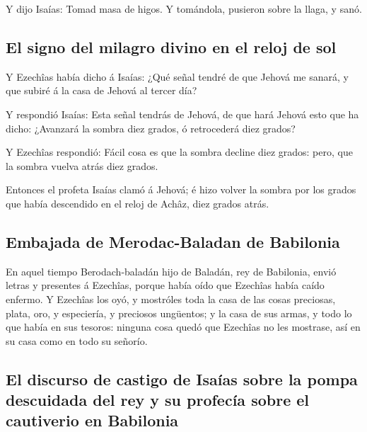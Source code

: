  Y dijo Isaías: Tomad masa de higos. Y tomándola, pusieron
sobre la llaga, y sanó.

\hypertarget{el-signo-del-milagro-divino-en-el-reloj-de-sol}{%
\subsection{El signo del milagro divino en el reloj de
sol}\label{el-signo-del-milagro-divino-en-el-reloj-de-sol}}

 Y Ezechîas había dicho á Isaías: ¿Qué señal tendré de que
Jehová me sanará, y que subiré á la casa de Jehová al tercer día?

 Y respondió Isaías: Esta señal tendrás de Jehová, de que
hará Jehová esto que ha dicho: ¿Avanzará la sombra diez grados, ó
retrocederá diez grados?

 Y Ezechîas respondió: Fácil cosa es que la sombra decline
diez grados: pero, que la sombra vuelva atrás diez grados.

 Entonces el profeta Isaías clamó á Jehová; é hizo volver
la sombra por los grados que había descendido en el reloj de Achâz, diez
grados atrás.

\hypertarget{embajada-de-merodac-baladan-de-babilonia}{%
\subsection{Embajada de Merodac-Baladan de
Babilonia}\label{embajada-de-merodac-baladan-de-babilonia}}

 En aquel tiempo Berodach-baladán hijo de Baladán, rey de
Babilonia, envió letras y presentes á Ezechîas, porque había oído que
Ezechîas había caído enfermo.  Y Ezechîas los oyó, y
mostróles toda la casa de las cosas preciosas, plata, oro, y especiería,
y preciosos ungüentos; y la casa de sus armas, y todo lo que había en
sus tesoros: ninguna cosa quedó que Ezechîas no les mostrase, así en su
casa como en todo su señorío.

\hypertarget{el-discurso-de-castigo-de-isauxedas-sobre-la-pompa-descuidada-del-rey-y-su-profecuxeda-sobre-el-cautiverio-en-babilonia}{%
\subsection{El discurso de castigo de Isaías sobre la pompa descuidada
del rey y su profecía sobre el cautiverio en
Babilonia}\label{el-discurso-de-castigo-de-isauxedas-sobre-la-pompa-descuidada-del-rey-y-su-profecuxeda-sobre-el-cautiverio-en-babilonia}}

